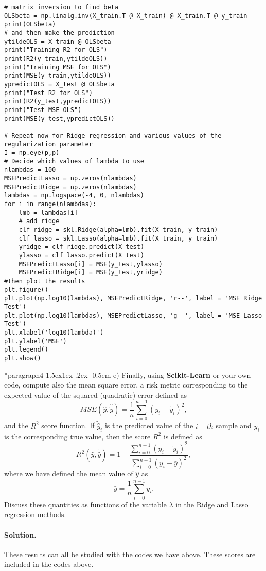 \documentclass[%
oneside,                 %
final,                   %
10pt]{article}
\makeatletter
\newenvironment{doconceexercise}{}{}
\newcommand\subex{\@startsection*{paragraph}{4}{\z@}%
                  {1.5ex\@plus1ex \@minus.2ex}%
                  {-0.5em}%
                  {\normalfont\normalsize\bfseries}}
\makeatother
\begin{document}
\begin{doconceexercise}
\begin{verbatim}
# matrix inversion to find beta
OLSbeta = np.linalg.inv(X_train.T @ X_train) @ X_train.T @ y_train
print(OLSbeta)
# and then make the prediction
ytildeOLS = X_train @ OLSbeta
print("Training R2 for OLS")
print(R2(y_train,ytildeOLS))
print("Training MSE for OLS")
print(MSE(y_train,ytildeOLS))
ypredictOLS = X_test @ OLSbeta
print("Test R2 for OLS")
print(R2(y_test,ypredictOLS))
print("Test MSE OLS")
print(MSE(y_test,ypredictOLS))

# Repeat now for Ridge regression and various values of the regularization parameter
I = np.eye(p,p)
# Decide which values of lambda to use
nlambdas = 100
MSEPredictLasso = np.zeros(nlambdas)
MSEPredictRidge = np.zeros(nlambdas)
lambdas = np.logspace(-4, 0, nlambdas)
for i in range(nlambdas):
    lmb = lambdas[i]
    # add ridge
    clf_ridge = skl.Ridge(alpha=lmb).fit(X_train, y_train)
    clf_lasso = skl.Lasso(alpha=lmb).fit(X_train, y_train)
    yridge = clf_ridge.predict(X_test)
    ylasso = clf_lasso.predict(X_test)
    MSEPredictLasso[i] = MSE(y_test,ylasso)
    MSEPredictRidge[i] = MSE(y_test,yridge)
#then plot the results
plt.figure()
plt.plot(np.log10(lambdas), MSEPredictRidge, 'r--', label = 'MSE Ridge Test')
plt.plot(np.log10(lambdas), MSEPredictLasso, 'g--', label = 'MSE Lasso Test')
plt.xlabel('log10(lambda)')
plt.ylabel('MSE')
plt.legend()
plt.show()
\end{verbatim}


\subex{e)}
Finally, using \textbf{Scikit-Learn} or your own code, compute also the mean square error, a risk metric corresponding to the expected value of the squared (quadratic) error defined as
\[ MSE(\hat{y},\hat{\tilde{y}}) = \frac{1}{n}
\sum_{i=0}^{n-1}(y_i-\tilde{y}_i)^2, 
\] 
and the $R^2$ score function.
If $\tilde{\hat{y}}_i$ is the predicted value of the $i-th$ sample and $y_i$ is the corresponding true value, then the score $R^2$ is defined as
\[
R^2(\hat{y}, \tilde{\hat{y}}) = 1 - \frac{\sum_{i=0}^{n - 1} (y_i - \tilde{y}_i)^2}{\sum_{i=0}^{n - 1} (y_i - \bar{y})^2},
\]
where we have defined the mean value  of $\hat{y}$ as
\[
\bar{y} =  \frac{1}{n} \sum_{i=0}^{n - 1} y_i.
\]
Discuss these quantities as functions of the variable $\lambda$ in the Ridge and Lasso regression methods.


\paragraph{Solution.}
These results can all be studied with the codes we have above. These scores are included in the codes above.



\end{doconceexercise}
\end{document}

